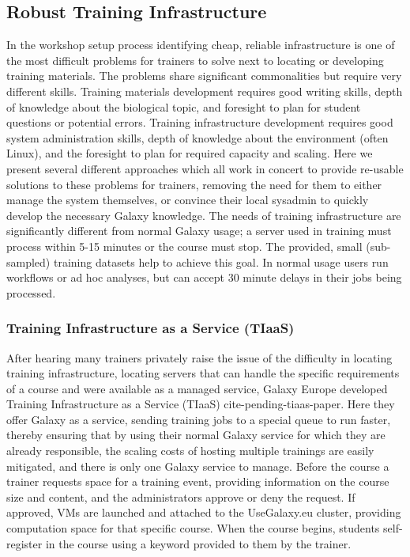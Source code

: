 \documentclass[10pt,letterpaper]{article}
\begin{document}
\subsection*{Robust Training Infrastructure}

In the workshop setup process identifying cheap, reliable infrastructure is one of the most difficult problems for trainers to solve next to locating or developing training materials.
The problems share significant commonalities but require very different skills.
Training materials development requires good writing skills, depth of knowledge about the biological topic, and foresight to plan for student questions or potential errors.
Training infrastructure development requires good system administration skills, depth of knowledge about the environment (often Linux), and the foresight to plan for required capacity and scaling.
Here we present several different approaches which all work in concert to provide re-usable solutions to these problems for trainers, removing the need for them to either manage the system themselves, or convince their local sysadmin to quickly develop the necessary Galaxy knowledge.
The needs of training infrastructure are significantly different from normal Galaxy usage; a server used in training must process within 5-15 minutes or the course must stop.
The provided, small (sub-sampled) training datasets help to achieve this goal.
In normal usage users run workflows or ad hoc analyses, but can accept 30 minute delays in their jobs being processed.

\subsubsection*{Training Infrastructure as a Service (TIaaS)}
After hearing many trainers privately raise the issue of the difficulty in locating training infrastructure, locating servers that can handle the specific requirements of a course and were available as a managed service, Galaxy Europe developed Training Infrastructure as a Service (TIaaS) {cite-pending-tiaas-paper}.
Here they offer Galaxy as a service, sending training jobs to a special queue to run faster, thereby ensuring that by using their normal Galaxy service for which they are already responsible, the scaling costs of hosting multiple trainings are easily mitigated, and there is only one Galaxy service to manage.
Before the course a trainer requests space for a training event, providing information on the course size and content, and the administrators approve or deny the request.
If approved, VMs are launched and attached to the UseGalaxy.eu cluster, providing computation space for that specific course.
When the course begins, students self-register in the course using a keyword provided to them by the trainer.
\end{document}

